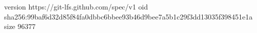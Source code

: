 version https://git-lfs.github.com/spec/v1
oid sha256:99baf6d32d85f84fa0dbbc6bbee93b46d9bee7a5b1c29f3dd13035f398451e1a
size 96377
